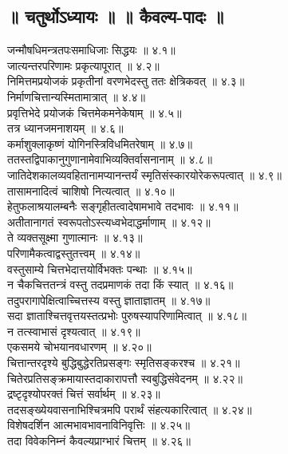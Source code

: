 \begin{multicols}{2}
\section*{॥ चतुर्थोऽध्यायः ॥  ॥ कैवल्य-पादः ॥}
\begin{flushleft}
\devanagarifont
जन्मौषधिमन्त्रतपःसमाधिजाः सिद्धयः ॥ ४.१॥\\
जात्यन्तरपरिणामः प्रकृत्यापूरात् ॥ ४.२॥\\
निमित्तमप्रयोजकं प्रकृतीनां वरणभेदस्तु ततः क्षेत्रिकवत् ॥ ४.३॥\\
निर्माणचित्तान्यस्मितामात्रात् ॥ ४.४॥\\
प्रवृत्तिभेदे प्रयोजकं चित्तमेकमनेकेषाम् ॥ ४.५॥\\
तत्र ध्यानजमनाशयम् ॥ ४.६॥\\
कर्माशुक्लाकृष्णं योगिनस्त्रिविधमितरेषाम् ॥ ४.७॥\\
ततस्तद्विपाकानुगुणानामेवाभिव्यक्तिर्वासनानाम् ॥ ४.८॥\\
जातिदेशकालव्यवहितानामप्यानन्तर्यं स्मृतिसंस्कारयोरेकरूपत्वात् ॥ ४.९॥\\
तासामनादित्वं चाशिषो नित्यत्वात् ॥ ४.१०॥\\
हेतुफलाश्रयालम्बनैः सङ्गृहीतत्वादेषामभावे तदभावः ॥ ४.११॥\\
अतीतानागतं स्वरूपतोऽस्त्यध्वभेदाद्धर्माणाम् ॥ ४.१२॥\\
ते व्यक्तसूक्ष्मा गुणात्मानः ॥ ४.१३॥\\
परिणामैकत्वाद्वस्तुतत्त्वम् ॥ ४.१४॥\\
वस्तुसाम्ये चित्तभेदात्तयोर्विभक्तः पन्थाः ॥ ४.१५॥\\
न चैकचित्ततन्त्रं वस्तु तदप्रमाणकं तदा किं स्यात् ॥ ४.१६॥\\
तदुपरागापेक्षित्वाच्चित्तस्य वस्तु ज्ञाताज्ञातम् ॥ ४.१७॥\\
सदा ज्ञाताश्चित्तवृत्तयस्तत्प्रभोः पुरुषस्यापरिणामित्वात् ॥ ४.१८॥\\
न तत्स्वाभासं दृश्यत्वात् ॥ ४.१९॥\\
एकसमये चोभयानवधारणम् ॥ ४.२०॥\\
चित्तान्तरदृश्ये बुद्धिबुद्धेरतिप्रसङ्गः स्मृतिसङ्करश्च ॥ ४.२१॥\\
चितेरप्रतिसङ्क्रमायास्तदाकारापत्तौ स्वबुद्धिसंवेदनम् ॥ ४.२२॥\\
द्रष्टृदृश्योपरक्तं चित्तं सर्वार्थम् ॥ ४.२३॥\\
तदसङ्ख्येयवासनाभिश्चित्रमपि परार्थं संहत्यकारित्वात् ॥ ४.२४॥\\
विशेषदर्शिन आत्मभावभावनाविनिवृत्तिः ॥ ४.२५॥\\
तदा विवेकनिम्नं कैवल्यप्राग्भारं चित्तम् ॥ ४.२६॥\\

\end{flushleft}
\end{multicols}

